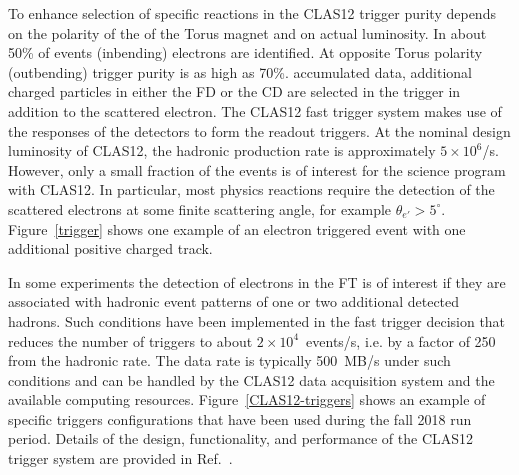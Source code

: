 \documentclass[final,3p,twocolumn]{elsarticle}
\begin{document}
To enhance selection of specific reactions in the CLAS12 trigger purity depends on the polarity of the 
of the Torus magnet and on actual luminosity. In about 50\% of events (inbending) electrons are identified. At opposite
Torus polarity (outbending) trigger purity is as high as 70\%.
accumulated data, additional charged particles in either the FD or the CD are selected in the trigger in addition to
the scattered electron. The CLAS12 fast trigger system makes use of the responses of the detectors to form the
readout triggers. At the nominal design luminosity of CLAS12, the hadronic production rate is approximately
$5 \times 10^6$/s. However, only a small fraction of the events is of interest for the science program with
CLAS12. In particular, most physics reactions require the detection of the scattered electrons at some finite
scattering angle, for example $\theta_{e'} > 5^\circ$.  Figure~\ref{trigger} shows one example of an electron
triggered event with one additional positive charged track.   
   
In some experiments the detection of electrons in the FT is of interest if they are associated with hadronic
event patterns of one or two additional detected hadrons. Such conditions have been implemented in the fast trigger
decision that reduces the number of triggers to about $2 \times 10^4$~events/s, i.e. by  a factor of 250 from the
hadronic rate. The data rate is typically 500~MB/s under such conditions and can be handled by the CLAS12 data
acquisition system and the available computing resources. Figure~\ref{CLAS12-triggers} shows an example of specific 
triggers configurations that have been used during the fall 2018 run period. Details of the design, functionality, and performance of
the CLAS12 trigger system are provided in Ref.~\cite{TRIG}. 
\end{document}
